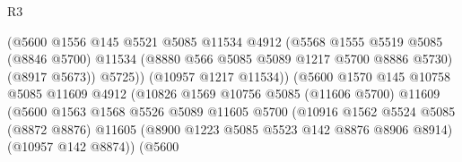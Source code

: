 \begin{lexlean}{R3}
\begin{coremodule}
                                              (@5600
                                                @1556
                                                @145
                                                @5521
                                                @5085
                                                @11534
                                                @4912
                                                (@5568
                                                  @1555
                                                  @5519
                                                  @5085
                                                  (@8846 @5700)
                                                  @11534
                                                  (@8880 @566 @5085 @5089 @1217 @5700 @8886 @5730)
                                                  (@8917 @5673))
                                                @5725))
                                            (@10957 @1217 @11534))
                                          (@5600
                                            @1570
                                            @145
                                            @10758
                                            @5085
                                            @11609
                                            @4912
                                            (@10826
                                              @1569
                                              @10756
                                              @5085
                                              (@11606 @5700)
                                              @11609
                                              (@5600
                                                @1563
                                                @1568
                                                @5526
                                                @5089
                                                @11605
                                                @5700
                                                (@10916
                                                  @1562
                                                  @5524
                                                  @5085
                                                  (@8872 @8876)
                                                  @11605
                                                  (@8900 @1223 @5085 @5523 @142 @8876 @8906 @8914)
                                                  (@10957 @142 @8874))
                                                (@5600

\end{coremodule}
\end{lexlean}
